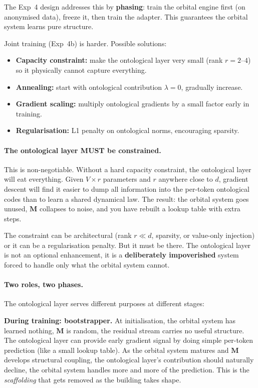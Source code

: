 \documentclass[11pt, a4paper]{article}
\newcommand{\M}{\mathbf{M}}
\theoremstyle{remark}
\begin{document}
\noindent
The Exp~4 design addresses this by \textbf{phasing}: train the orbital engine first (on anonymised data), freeze it, then train the adapter.
This guarantees the orbital system learns pure structure.

Joint training (Exp~4b) is harder.
Possible solutions:
\begin{itemize}[nosep]
    \item \textbf{Capacity constraint:} make the ontological layer very small (rank $r = 2$--$4$) so it physically cannot capture everything.
    \item \textbf{Annealing:} start with ontological contribution $\lambda = 0$, gradually increase.
    \item \textbf{Gradient scaling:} multiply ontological gradients by a small factor early in training.
    \item \textbf{Regularisation:} L1 penalty on ontological norms, encouraging sparsity.
\end{itemize}

\paragraph{The ontological layer MUST be constrained.}
This is non-negotiable.
Without a hard capacity constraint, the ontological layer will eat everything.
Given $V \times r$ parameters and $r$ anywhere close to $d$, gradient descent will find it easier to dump all information into the per-token ontological codes than to learn a shared dynamical law.
The result: the orbital system goes unused, $\M$ collapses to noise, and you have rebuilt a lookup table with extra steps.

The constraint can be architectural (rank $r \ll d$, sparsity, or value-only injection) or it can be a regularisation penalty.
But it must be there.
The ontological layer is not an optional enhancement, it is a \textbf{deliberately impoverished} system forced to handle only what the orbital system cannot.

\paragraph{Two roles, two phases.}
The ontological layer serves different purposes at different stages:

\textbf{During training: bootstrapper.}
At initialisation, the orbital system has learned nothing, $\M$ is random, the residual stream carries no useful structure.
The ontological layer can provide early gradient signal by doing simple per-token prediction (like a small lookup table).
As the orbital system matures and $\M$ develops structural coupling, the ontological layer's contribution should naturally decline, the orbital system handles more and more of the prediction.
This is the \emph{scaffolding} that gets removed as the building takes shape.
\end{document}
